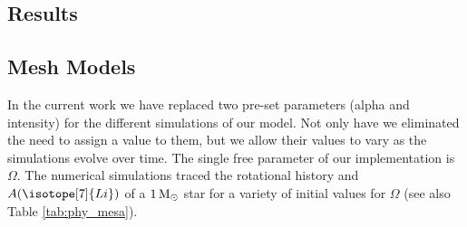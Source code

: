 \documentclass[fleqn,usenatbib]{mnras}
\begin{document}
\begin{ceqn}
\section{Results} \label{sec_3}

\subsection{Mesh Models} \label{sec_mesh}
In the current work we have replaced two pre-set parameters (alpha and intensity) for the different simulations of our model. Not only have we eliminated the need to assign a value to them, but we allow their values to vary as the simulations evolve over time. The single free parameter of our implementation is $\Omega$. The numerical simulations traced the rotational history and $A(\isotope[7]{Li})$ of a $1\, \mathrm{M}_\odot$ star for a variety of initial values for $\Omega$ (see also Table \ref{tab:phy_mesa}).\par


\end{ceqn}
\end{document}
